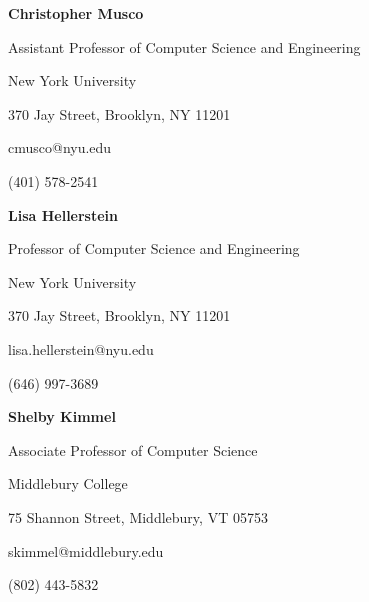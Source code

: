 \documentclass[11pt]{article}
\begin{document}
{\setlength{\parindent}{0cm}

\textbf{Christopher Musco}

Assistant Professor of Computer Science and Engineering

New York University

370 Jay Street, Brooklyn, NY 11201

cmusco@nyu.edu

(401) 578-2541

\vspace{2em}

\textbf{Lisa Hellerstein}

Professor of Computer Science and Engineering

New York University

370 Jay Street, Brooklyn, NY 11201

lisa.hellerstein@nyu.edu

(646) 997-3689

\vspace{2em}

\textbf{Shelby Kimmel}

Associate Professor of Computer Science

Middlebury College

75 Shannon Street, Middlebury, VT 05753

skimmel@middlebury.edu

(802) 443-5832

}
\end{document}
